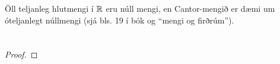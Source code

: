 \documentclass[12pt]{book}
\begin{document}
\begin{daemi}

Öll teljanleg hlutmengi í $\mathbb{R}$ eru núll mengi, en Cantor-mengið er dæmi um óteljanlegt núllmengi (sjá bls. 19 í bók og ``mengi og firðrúm'').
\end{daemi}

\section{}
\subsection{}
\subsection{}
\begin{proof}
\end{proof}
\end{document}
